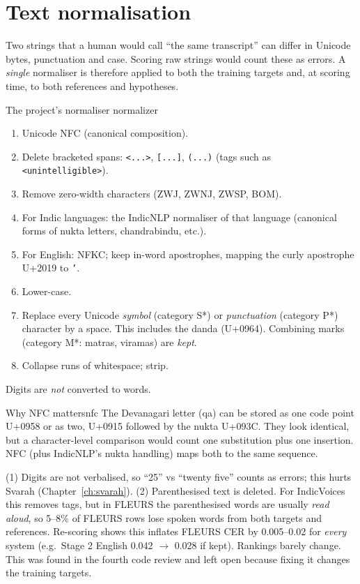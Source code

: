 \section{Text normalisation}
\label{sec:norm}

Two strings that a human would call ``the same transcript'' can differ in Unicode bytes, punctuation and case. Scoring raw strings
would count these as errors. A \emph{single} normaliser is therefore applied to both the training targets and, at scoring time, to
both references and hypotheses.

\begin{definition}{The project's normaliser }{normalizer}
\begin{enumerate}
\item Unicode NFC (canonical composition).
\item Delete bracketed spans: \texttt{<...>}, \texttt{[...]}, \texttt{(...)} (tags such as \texttt{<unintelligible>}).
\item Remove zero-width characters (ZWJ, ZWNJ, ZWSP, BOM).
\item For Indic languages: the IndicNLP normaliser of that language (canonical forms of nukta letters, chandrabindu, etc.).
\item For English: NFKC; keep in-word apostrophes, mapping the curly apostrophe U+2019 to \texttt{'}.
\item Lower-case.
\item Replace every Unicode \emph{symbol} (category S*) or \emph{punctuation} (category P*) character by a space. This includes the
danda  (U+0964). Combining marks (category M*: matras, viramas) are \emph{kept}.
\item Collapse runs of whitespace; strip.
\end{enumerate}
Digits are \emph{not} converted to words.
\end{definition}

\begin{example}{Why NFC matters}{nfc}
The Devanagari letter  (qa) can be stored as one code point U+0958 or as two,  U+0915 followed by the nukta U+093C.
They look identical, but a character-level comparison would count one substitution plus one insertion. NFC (plus IndicNLP's nukta
handling) maps both to the same sequence.
\end{example}

\begin{vivatip}
(1) Digits are not verbalised, so ``25'' vs ``twenty five'' counts as errors; this hurts Svarah (Chapter~\ref{ch:svarah}).
(2) Parenthesised text is deleted. For IndicVoices this removes tags, but in FLEURS the parenthesised words are usually \emph{read
aloud}, so 5--8\% of FLEURS rows lose spoken words from both targets and references. Re-scoring shows this inflates FLEURS CER by
0.005--0.02 for \emph{every} system (e.g.\ Stage 2 English 0.042 $\to$ 0.028 if kept). Rankings barely change. This was found in
the fourth code review and left open because fixing it changes the training targets.
\end{vivatip}

